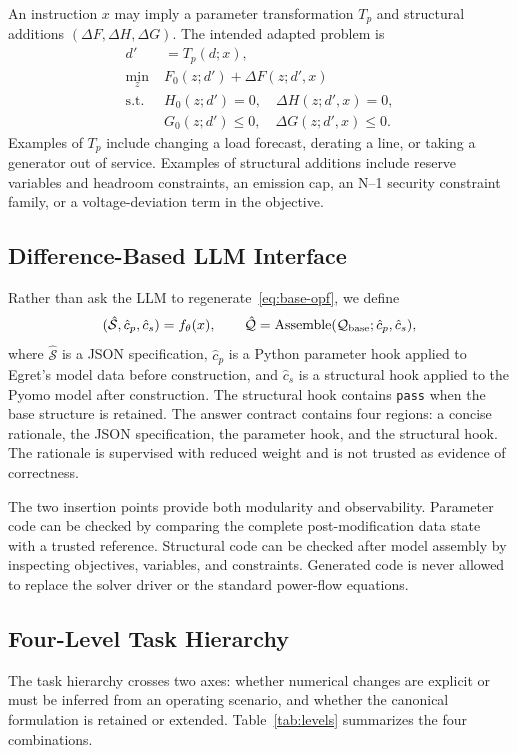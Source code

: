 \documentclass[lettersize,journal]{IEEEtran}
\begin{document}
An instruction $x$ may imply a parameter transformation $T_p$ and structural additions $(\Delta F,\Delta H,\Delta G)$. The intended adapted problem is
\begin{subequations}\label{eq:adapted-opf}
\begin{align}
  d' &= T_p(d;x),\\
  \min_z\;&F_0(z;d')+\Delta F(z;d',x)\\
  \mathrm{s.t.}\;&H_0(z;d')=0,\quad \Delta H(z;d',x)=0,\\
  &G_0(z;d')\le0,\quad \Delta G(z;d',x)\le0.
\end{align}
\end{subequations}
Examples of $T_p$ include changing a load forecast, derating a line, or taking a generator out of service. Examples of structural additions include reserve variables and headroom constraints, an emission cap, an N--1 security constraint family, or a voltage-deviation term in the objective.

\subsection{Difference-Based LLM Interface}
Rather than ask the LLM to regenerate~\eqref{eq:base-opf}, we define
\begin{equation}\label{eq:llm-interface}
(\hat{\mathcal S},\hat c_p,\hat c_s)=f_\theta(x),\qquad
\hat{\mathcal Q}=\operatorname{Assemble}(\mathcal{Q}_{\rm base};\hat c_p,\hat c_s),
\end{equation}
where $\hat{\mathcal S}$ is a JSON specification, $\hat c_p$ is a Python parameter hook applied to Egret's model data before construction, and $\hat c_s$ is a structural hook applied to the Pyomo model after construction. The structural hook contains \texttt{pass} when the base structure is retained. The answer contract contains four regions: a concise rationale, the JSON specification, the parameter hook, and the structural hook. The rationale is supervised with reduced weight and is not trusted as evidence of correctness.

The two insertion points provide both modularity and observability. Parameter code can be checked by comparing the complete post-modification data state with a trusted reference. Structural code can be checked after model assembly by inspecting objectives, variables, and constraints. Generated code is never allowed to replace the solver driver or the standard power-flow equations.

\subsection{Four-Level Task Hierarchy}
The task hierarchy crosses two axes: whether numerical changes are explicit or must be inferred from an operating scenario, and whether the canonical formulation is retained or extended. Table~\ref{tab:levels} summarizes the four combinations.
\end{document}
